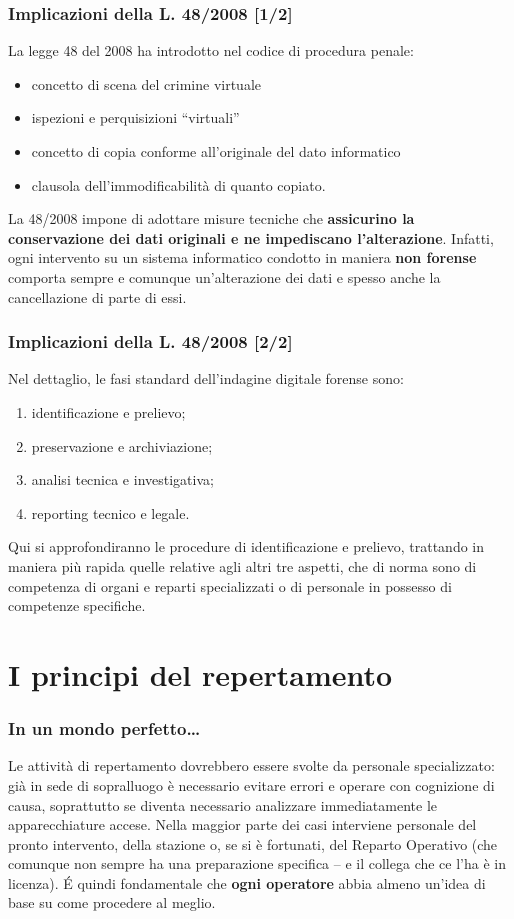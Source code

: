 \documentclass[11pt]{beamer}
\begin{document}
	\begin{frame}
		\frametitle{Implicazioni della L. 48/2008 [1/2]}
		La legge 48 del 2008 ha introdotto nel codice di procedura penale:
		\begin{itemize}
		\item concetto di scena del crimine virtuale
		\item ispezioni e perquisizioni ``virtuali''
		\item concetto di copia conforme all'originale del dato informatico
		\item clausola dell'immodificabilità di quanto copiato.
		\end{itemize}		
		\vfill
		La 48/2008 impone di adottare misure tecniche che \textbf{assicurino la conservazione dei dati originali e ne impediscano l'alterazione}.
		\vfill
		Infatti, ogni intervento su un sistema informatico  condotto in maniera \textbf{non forense} comporta sempre e comunque un'alterazione dei dati e spesso anche la cancellazione di parte di essi.
	\end{frame}
	\begin{frame}
		\frametitle{Implicazioni della L. 48/2008 [2/2]}	
		Nel dettaglio, le fasi standard dell'indagine digitale forense sono:
		\begin{enumerate}
			\item identificazione e prelievo;
			\item preservazione e archiviazione;
			\item analisi tecnica e investigativa;
			\item reporting tecnico e legale.
		\end{enumerate}
		\vfill
		Qui si approfondiranno le procedure di identificazione e prelievo, trattando in maniera più rapida quelle relative agli altri tre aspetti, che di norma sono di competenza di organi e reparti specializzati o di personale in possesso di competenze specifiche.
	\end{frame}
	
	\section[Repertamento]{I principi del repertamento}
	
	\begin{frame}
		\frametitle{In un mondo perfetto\dots}
		Le attività di repertamento dovrebbero essere svolte da personale specializzato: già in sede di sopralluogo è necessario evitare errori e operare con cognizione di causa, soprattutto se diventa necessario analizzare immediatamente le apparecchiature accese.
		\vfill
		Nella maggior parte dei casi interviene personale del pronto intervento, della stazione o, se si è fortunati, del Reparto Operativo (che comunque non sempre ha una preparazione specifica -- e il collega che ce l'ha è in licenza). 
		\vfill
		\'{E} quindi fondamentale che \textbf{ogni operatore} abbia almeno un'idea di base su come procedere al meglio.
	\end{frame}
	
\end{document}
